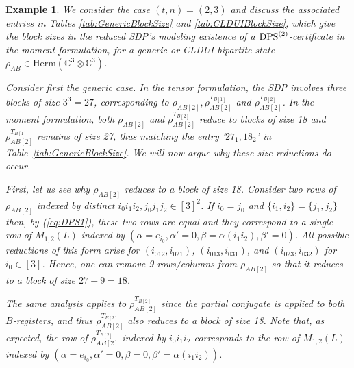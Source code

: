 \documentclass[11pt]{article}
\newcommand{\C}{\ensuremath{\mathbb{C}}} %
\newcommand{\Herm}{\mathrm{Herm}}
\newcommand{\DPS}{\text{\rm DPS}}
\newcommand{\ot}{\otimes}
\theoremstyle{plain}
\newtheorem{example}[satz]{Example}
\begin{document}
\begin{example}\label{ex:t2n3} 
We consider the case $(t,n)=(2,3)$ and discuss the associated entries in Tables \ref{tab:GenericBlockSize}  and \ref{tab:CLDUIBlockSize}, which  give the  block sizes  in the reduced SDP's modeling existence of a $\DPS^{(2)}$-certificate in the moment formulation, for a generic or CLDUI bipartite state $\rho_{AB}\in \Herm(\C^3\ot \C^3)$. 

\smallskip
Consider first the generic case. In  the tensor formulation, the SDP involves  three   blocks  of size $3^3=27$, corresponding to $\rho_{AB[2]},\rho_{AB[2]}^{T_{B[1]}}$ and $\rho_{AB[2]}^{T_{B[2]}}$. In the moment formulation, both $\rho_{AB[2]}$ and $\rho_{AB[2]}^{T_{B[2]}}$ reduce to blocks of size 18 and $\rho_{AB[2]}^{T_{B[1]}}$ remains of size 27, thus matching the entry `$27_1, 18_2$'   in Table~\ref{tab:GenericBlockSize}. We will now argue why these  size reductions do occur. 

First, let us see why $\rho_{AB[2]}$ reduces to a block of size 18. Consider two rows of $\rho_{AB[2]}$ indexed by  distinct   $i_0i_1i_2, j_0j_1j_2\in [3]^2$. If $i_0=j_0$ and $\{i_1,i_2\}=\{j_1,j_2\}$ %
then, by (\ref{eq:DPS1}),  these two rows are equal and they correspond to a single row of $M_{1,2}(L)$ indexed by $(\alpha=e_{i_0}, \alpha'=0,\beta=\alpha(i_1i_2), \beta'=0)$. All possible reductions of this form    arise for  $(i_012,i_021)$,  $(i_013,i_031)$, and $(i_023,i_032)$ for  $i_0\in [3]$. Hence, one can remove 9 rows/columns from $\rho_{AB[2]}$ so that it reduces to a block of size $27-9=18$. 

The same analysis applies to   $\rho_{AB[2]}^{T_{B[2]}}$ since the partial conjugate is applied to both $B$-registers, and thus $\rho_{AB[2]}^{T_{B[2]}}$ also reduces to a block of size 18. Note that, as expected,  the row of $\rho_{AB[2]}^{T_{B[2]}}$
indexed by $i_0i_1i_2$  corresponds to the row of $M_{1,2}(L)$ indexed by $(\alpha=e_{i_0},\alpha'=0,\beta=0,\beta'=\alpha(i_1i_2))$.


\end{example}
\end{document}
